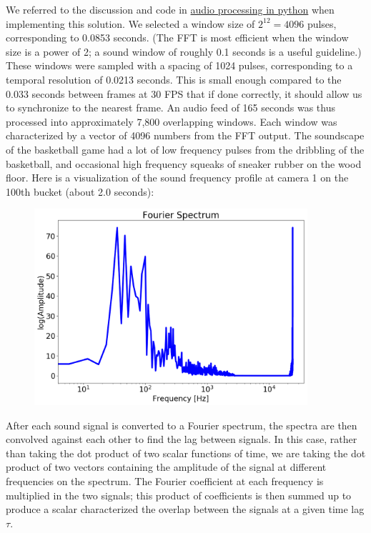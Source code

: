 \documentclass{article}
\begin{document}
We referred to the discussion and code in 
\href{https://engineersportal.com/blog/2018/9/13/audio-processing-in-python-part-i-sampling-and-the-fast-fourier-transform}{audio processing in python}
when implementing this solution.
We selected a window size of $2^{12} = 4096$ pulses, corresponding to 0.0853 seconds.
(The FFT is most efficient when the window size is a power of 2; a sound window of roughly 0.1 seconds is a useful guideline.)
These windows were sampled with a spacing of 1024 pulses, corresponding to a temporal resolution of 0.0213 seconds. 
This is small enough compared to the 0.033 seconds between frames at 30 FPS that 
if done correctly, it should allow us to synchronize to the nearest frame.  
An audio feed of 165 seconds was thus processed into approximately 7,800 overlapping windows.
Each window was characterized by a vector of 4096 numbers from the FFT output.
The soundscape of the basketball game had a lot of low frequency pulses from the dribbling of the
basketball, and occasional high frequency squeaks of sneaker rubber on the wood floor.
Here is a visualization of the sound frequency profile at camera 1 on the 100th bucket (about 2.0 seconds):
\begin{figure}[H]
\center
\includegraphics[width=0.90\textwidth]{fourier_spectrum.png}
\end{figure}

After each sound signal is converted to a Fourier spectrum, 
the spectra are then convolved against each other to find the lag between signals.
In this case, rather than taking the dot product of two scalar functions of time, 
we are taking the dot product of two vectors containing the amplitude of the 
signal at different frequencies on the spectrum.
The Fourier coefficient at each frequency is multiplied in the two signals;
this product of coefficients is then summed up to produce a scalar characterized
the overlap between the signals at a given time lag $\tau$.
\end{document}
